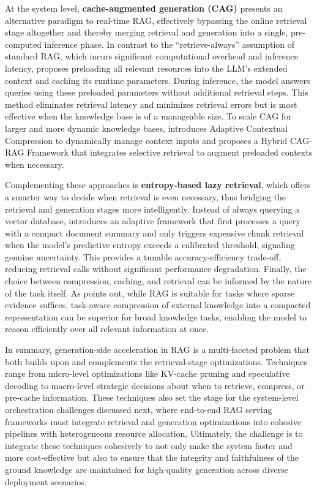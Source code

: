 \documentclass[11pt]{article}
\begin{document}
At the system level, \textbf{cache-augmented generation (CAG)} presents an alternative paradigm to real-time RAG, effectively bypassing the online retrieval stage altogether and thereby merging retrieval and generation into a single, pre-computed inference phase. In contrast to the ``retrieve-always'' assumption of standard RAG, which incurs significant computational overhead and inference latency, \cite{ref532} proposes preloading all relevant resources into the LLM's extended context and caching its runtime parameters. During inference, the model answers queries using these preloaded parameters without additional retrieval steps. This method eliminates retrieval latency and minimizes retrieval errors but is most effective when the knowledge base is of a manageable size. To scale CAG for larger and more dynamic knowledge bases, \cite{ref533} introduces Adaptive Contextual Compression to dynamically manage context inputs and proposes a Hybrid CAG-RAG Framework that integrates selective retrieval to augment preloaded contexts when necessary.

Complementing these approaches is \textbf{entropy-based lazy retrieval}, which offers a smarter way to decide when retrieval is even necessary, thus bridging the retrieval and generation stages more intelligently. Instead of always querying a vector database, \cite{ref534} introduces an adaptive framework that first processes a query with a compact document summary and only triggers expensive chunk retrieval when the model's predictive entropy exceeds a calibrated threshold, signaling genuine uncertainty. This provides a tunable accuracy-efficiency trade-off, reducing retrieval calls without significant performance degradation. Finally, the choice between compression, caching, and retrieval can be informed by the nature of the task itself. As \cite{ref535} points out, while RAG is suitable for tasks where sparse evidence suffices, task-aware compression of external knowledge into a compacted representation can be superior for broad knowledge tasks, enabling the model to reason efficiently over all relevant information at once.

In summary, generation-side acceleration in RAG is a multi-faceted problem that both builds upon and complements the retrieval-stage optimizations. Techniques range from micro-level optimizations like KV-cache pruning and speculative decoding to macro-level strategic decisions about when to retrieve, compress, or pre-cache information. These techniques also set the stage for the system-level orchestration challenges discussed next, where end-to-end RAG serving frameworks must integrate retrieval and generation optimizations into cohesive pipelines with heterogeneous resource allocation. Ultimately, the challenge is to integrate these techniques cohesively to not only make the system faster and more cost-effective but also to ensure that the integrity and faithfulness of the ground knowledge are maintained for high-quality generation across diverse deployment scenarios.
\end{document}

